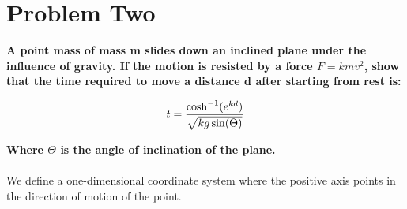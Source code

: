 \documentclass[10pt]{article} %
\begin{document}
\vspace{1 cm}

\section{Problem Two}
\textbf{A point mass of mass m slides down an inclined plane under the influence of gravity. If the motion is resisted by a force $F=kmv^2$, show that the time required to move a distance d after starting from rest is:}

\begin{equation*}
  t = \frac{\cosh^{-1}(e^{kd})}{\sqrt{kg\sin(\Theta)}}\\
\end{equation*}

\textbf{Where $\Theta$ is the angle of inclination of the plane.} \\ \\

We define a one-dimensional coordinate system where the positive axis points in the direction of motion of the point.\\
\end{document}
